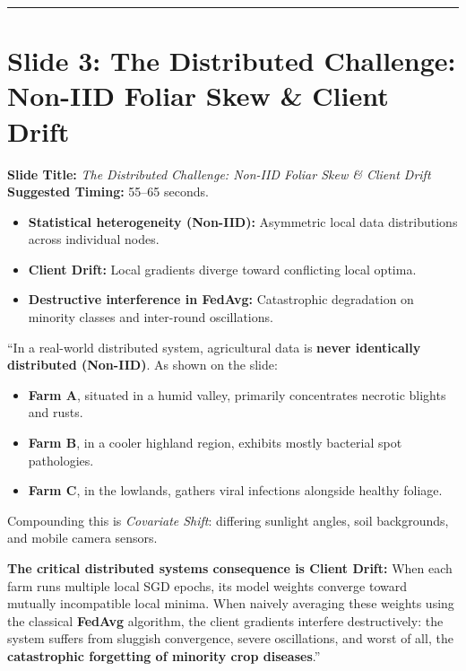 \documentclass[11pt,a4paper]{article}
\begin{document}
\vspace{0.35cm}\hrule\vspace{0.35cm}

\section{Slide 3: The Distributed Challenge: Non-IID Foliar Skew \& Client Drift}
\textbf{Slide Title:} \textit{The Distributed Challenge: Non-IID Foliar Skew \& Client Drift} \\
\textbf{Suggested Timing:} 55--65 seconds.

\begin{tcolorbox}[colframe=primaryblue, title=\textbf{Key Distributed Systems Points to Emphasize}]
\begin{itemize}[leftmargin=*]
    \item \textbf{Statistical heterogeneity (Non-IID):} Asymmetric local data distributions across individual nodes.
    \item \textbf{Client Drift:} Local gradients diverge toward conflicting local optima.
    \item \textbf{Destructive interference in FedAvg:} Catastrophic degradation on minority classes and inter-round oscillations.
\end{itemize}
\end{tcolorbox}

\begin{tcolorbox}[colframe=darkgreen, title=\textbf{What to Say in the Presentation (Literal Script)}]
``In a real-world distributed system, agricultural data is \textbf{never identically distributed (Non-IID)}. As shown on the slide:
\begin{itemize}
    \item \textbf{Farm A}, situated in a humid valley, primarily concentrates necrotic blights and rusts.
    \item \textbf{Farm B}, in a cooler highland region, exhibits mostly bacterial spot pathologies.
    \item \textbf{Farm C}, in the lowlands, gathers viral infections alongside healthy foliage.
\end{itemize}
Compounding this is \textit{Covariate Shift}: differing sunlight angles, soil backgrounds, and mobile camera sensors.

\textbf{The critical distributed systems consequence is Client Drift:} When each farm runs multiple local SGD epochs, its model weights converge toward mutually incompatible local minima. When naively averaging these weights using the classical \textbf{FedAvg} algorithm, the client gradients interfere destructively: the system suffers from sluggish convergence, severe oscillations, and worst of all, the \textbf{catastrophic forgetting of minority crop diseases}.''
\end{tcolorbox}
\end{document}

